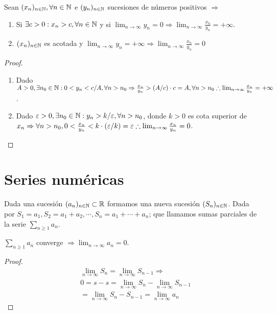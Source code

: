 \begin{prop}
  Sean $(x_n)_{n \in \mathbb{N}}, \forall n \in \mathbb{N}$ e $(y_n)_{n \in \mathbb{N}}$ sucesiones de números positivos $\Rightarrow$ \begin{enumerate}
    \item Si $\exists c > 0 : x_n > c, \forall n \in \mathbb{N}$ y si $\lim_{n \to \infty} y_n = 0 \Rightarrow \lim_{n \to \infty} \frac{x_n}{y_n} = +\infty$.
    \item $(x_n)_{n \in \mathbb{N}}$ es acotada y $\lim_{n \to \infty} y_n = +\infty \Rightarrow \lim_{n \to \infty} \frac{x_n}{y_n} = 0$
  \end{enumerate}
  \begin{proof}
    \begin{enumerate}
      \item Dado $A > 0, \exists n_0 \in \mathbb{N} : 0 < y_n < c/A, \forall n > n_0 \Rightarrow \frac{x_n}{y_n} > (A/c) \cdot c = A, \forall n > n_0 \therefore \lim_{n \to \infty} \frac{x_n}{y_n} = + \infty$.
      \item Dado $\varepsilon > 0, \exists n_0 \in \mathbb{N} : y_n > k/\varepsilon, \forall n > n_0$, donde $k > 0$ es cota superior de $x_n \Rightarrow \forall n > n_0, 0 < \frac{x_n}{y_n} < k \cdot (\varepsilon/k) = \varepsilon \therefore \lim_{n \to \infty} \frac{x_n}{y_n} = 0$.
    \end{enumerate}
  \end{proof}
\end{prop}

\section{Series numéricas}

Dada una sucesión $(a_n)_{n \in \mathbb{N}} \subset \mathbb{R}$ formamos una nueva sucesión $(S_n)_{n \in \mathbb{N}}$. Dada por $S_1 = a_1, S_2 = a_1 + a_2, \cdots, S_n = a_1 + \cdots + a_n$; que llamamos sumas parciales de la serie $\sum_{n \geq 1} a_n$.

\begin{theorem}
  $\sum_{n \geq 1} a_n$ converge $\Rightarrow \lim_{n \to \infty} a_n = 0$.
  \begin{proof}
    \begin{align*}
       & \lim_{n \to \infty} S_n = \lim_{n \to \infty} S_{n-1} \Rightarrow \\
       & 0 = s - s = \lim_{n \to \infty} S_n - \lim_{n \to \infty} S_{n-1} \\
       & = \lim_{n \to \infty} S_n - S_{n-1} = \lim_{n \to \infty} a_n
    \end{align*}
  \end{proof}
\end{theorem}

